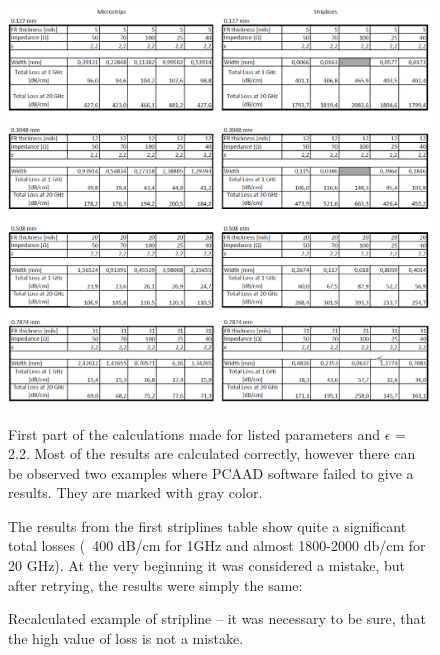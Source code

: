 \documentclass[eng,printmode]{mgr}
\begin{document}
\newpage
\begin{figure}[h]
	\centering
	\includegraphics[width=1\linewidth]{table1a}
	\label{fig:microm1}
	\caption{First part of the calculations made for listed parameters and $\epsilon$ = 2.2. Most of the results are calculated correctly, however there can be observed two examples where PCAAD software failed to give a results. They are marked with gray color.}
\end{figure}

\begin{figure}[H]
\noindent
The results from the first striplines table show quite a significant total losses (~400 dB/cm for 1GHz and almost 1800-2000 db/cm for 20 GHz).
At the very beginning it was considered a mistake, but after retrying, the results were simply the same:
\\

	\label{fig:pcaad2}
	\caption{Recalculated example of stripline -- it was necessary to be sure, that the high value of loss is not a mistake.}
\end{figure}
\end{document}
